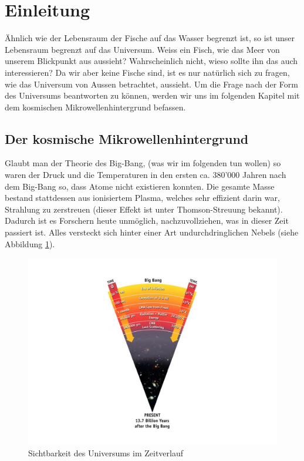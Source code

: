 \section{Einleitung}
Ähnlich wie der Lebensraum der Fische auf das Wasser begrenzt ist, so ist unser 
Lebensraum begrenzt auf das Universum.
Weiss ein Fisch, wie das Meer von unserem Blickpunkt aus aussieht?
Wahrscheinlich nicht, wieso sollte ihn das auch interessieren?
Da wir aber keine Fische sind, ist es nur natürlich sich zu fragen, wie das 
Universum von Aussen betrachtet, aussieht.
Um die Frage nach der Form des Universums beantworten zu können, werden wir uns 
im folgenden Kapitel mit dem kosmischen Mikrowellenhintergrund befassen.

\subsection{Der kosmische Mikrowellenhintergrund}
Glaubt man der Theorie des Big-Bang, (was wir im folgenden tun wollen) so waren 
der Druck und die Temperaturen in den ersten ca. 380'000 Jahren nach dem 
Big-Bang so, dass Atome nicht existieren konnten.
Die gesamte Masse bestand stattdessen aus ionisiertem Plasma, welches sehr 
effizient darin war, Strahlung zu zerstreuen (dieser Effekt ist unter 
Thomson-Streuung bekannt).
Dadurch ist es Forschern heute unmöglich, nachzuvollziehen, was in dieser Zeit 
passiert ist.
Alles versteckt sich hinter einer Art undurchdringlichen Nebels (siehe 
Abbildung \ref{fig:radiation_scattering}).
\begin{figure}
	\centering
	\includegraphics[width=\linewidth]{cmb/images/radiation_scattering.jpg}
	\caption{Sichtbarkeit des Universums im Zeitverlauf}
	\label{fig:radiation_scattering}
\end{figure}
